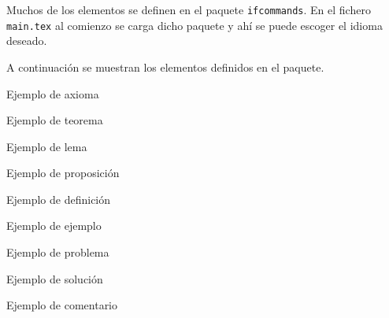 Muchos de los elementos se definen en el paquete \texttt{ifcommands}. En el fichero \texttt{main.tex} al comienzo se carga dicho paquete y ahí se puede escoger el idioma deseado.

A continuación se muestran los elementos definidos en el paquete.

\begin{ifaxiom}
	Ejemplo de axioma
\end{ifaxiom}

\begin{iftheorem}
	Ejemplo de teorema
\end{iftheorem}

\begin{iflemma}
	Ejemplo de lema
\end{iflemma}

\begin{ifproposition}
	Ejemplo de proposición
\end{ifproposition}

\begin{ifdefinition}
	Ejemplo de definición
\end{ifdefinition}

\begin{ifexample}
	Ejemplo de ejemplo
\end{ifexample}

\begin{ifproblem}
	Ejemplo de problema
\end{ifproblem}

\begin{ifsolution}
	Ejemplo de solución
\end{ifsolution}

\begin{ifremark}
	Ejemplo de comentario
\end{ifremark}

